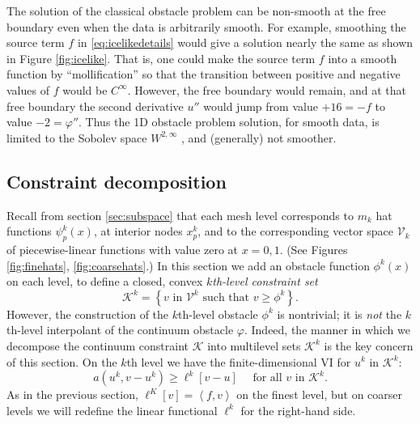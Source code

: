 \documentclass[letterpaper,final,12pt,reqno]{amsart}
\newcommand{\ip}[2]{\left<#1,#2\right>}
\numberwithin{equation}{section}
\numberwithin{figure}{section}
\numberwithin{table}{section}
\begin{document}
The solution of the classical obstacle problem can be non-smooth at the free boundary even when the data is arbitrarily smooth.  For example, smoothing the source term $f$ in \eqref{eq:icelikedetails} would give a solution nearly the same as shown in Figure \ref{fig:icelike}.  That is, one could make the source term $f$ into a smooth function by ``mollification'' \cite{Evans2010} so that the transition between positive and negative values of $f$ would be $C^\infty$.  However, the free boundary would remain, and at that free boundary the second derivative $u''$ would jump from value $+16=-f$ to value $-2=\varphi''$.  Thus the 1D obstacle problem solution, for smooth data, is limited to the Sobolev space $W^{2,\infty}$ \cite[section IV.6]{KinderlehrerStampacchia1980}, and (generally) not smoother.

\subsection*{Constraint decomposition}  Recall from section \ref{sec:subspace} that each mesh level corresponds to $m_k$ hat functions $\psi_p^k(x)$, at interior nodes $x_p^k$, and to the corresponding vector space $\mathcal{V}_k$ of piecewise-linear functions with value zero at $x=0,1$.  (See Figures \ref{fig:finehats}, \ref{fig:coarsehats}.)  In this section we add an obstacle function $\phi^k(x)$ on each level, to define a closed, convex $k$\emph{th-level constraint set}
\begin{equation}
\mathcal{K}^k = \left\{v \text{ in } \mathcal{V}^k \text{ such that } v \ge \phi^k\right\}.  \label{eq:levelKdefine}
\end{equation}
However, the construction of the $k$th-level obstacle $\phi^k$ is nontrivial; it is \emph{not} the $k$th-level interpolant of the continuum obstacle $\varphi$.  Indeed, the manner in which we decompose the continuum constraint $\mathcal{K}$ into multilevel sets $\mathcal{K}^k$ is the key concern of this section.  On the $k$th level we have the finite-dimensional VI for $u^k$ in $\mathcal{K}^k$:
\begin{equation}
  a(u^k,v-u^k) \ge \ell^k[v-u] \quad \text{ for all } v \text{ in } \mathcal{K}^k. \label{eq:levelvi}
\end{equation}
As in the previous section, $\ell^K[v]=\ip{f}{v}$ on the finest level, but on coarser levels we will redefine the linear functional $\ell^k$ for the right-hand side.
\end{document}
